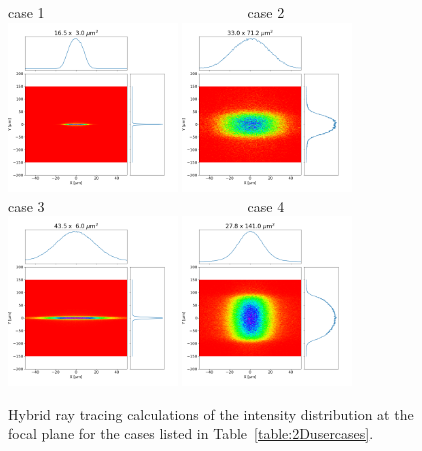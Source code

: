 \documentclass{iucr}              %
\begin{document}
\vspace{4cm}

\begin{figure}
    \label{fig:hybrid}
    \centering
    case 1~~~~~~~~~~~~~~~~~~~~~~~~~~~~~case 2\\
    \includegraphics[width=0.4\textwidth]{figures/case1_hybrid.png}
    \includegraphics[width=0.4\textwidth]{figures/case2_hybrid.png}\\
    case 3~~~~~~~~~~~~~~~~~~~~~~~~~~~~~case 4\\
    \includegraphics[width=0.4\textwidth]{figures/case3_hybrid.png}
    \includegraphics[width=0.4\textwidth]{figures/case4_hybrid.png}
    \caption{Hybrid ray tracing calculations of the intensity distribution at the focal plane for the cases listed in Table~\ref{table:2Dusercases}.}
\end{figure}
\end{document}
